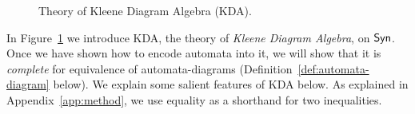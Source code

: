 \documentclass{lmcs}
\theoremstyle{plain}\newtheorem{satz}[thm]{Satz} %
\begin{document}
\begin{figure}


\caption{Theory of Kleene Diagram Algebra (KDA).}\label{fig:axioms}
\vspace{-0.5cm}
\end{figure}

In Figure~\ref{fig:axioms} we introduce KDA, the  theory of \emph{Kleene Diagram Algebra}, on $\mathsf{Syn}$. Once we have shown how to encode automata into it, we will show that it is \emph{complete} for equivalence of automata-diagrams (Definition~\ref{def:automata-diagram} below). We explain some salient features of KDA below. As explained in Appendix~\ref{app:method}, we use equality as a shorthand for two inequalities.
\end{document}
